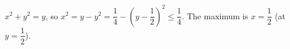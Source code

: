 $x^2+y^2=y$, so $x^2=y-y^2=\dfrac14-\left(y-\dfrac12\right)^2\le\dfrac14$. The maximum is $x=\boxed{\dfrac12}$ (at $y=\dfrac12$).

